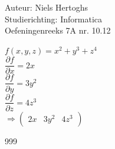 \documentclass[a4paper]{article}
\begin{document}
\noindent \large Auteur: Niels Hertoghs \\
\noindent \large Studierichting:  Informatica\\
\noindent \large Oefeningenreeks 7A nr. 10.12\\


\medskip

\normalsize

$f(x,y,z) = x^2 + y^3 + z^4$\\

$\dfrac{\partial f}{\partial x} = 2x$\\

$\dfrac{\partial f}{\partial y} = 3y^2$\\

$\dfrac{\partial f}{\partial z} = 4z^3$\\

$\Rightarrow 
\left(\begin{array}{ccc}
2x & 3y^2 & 4z^3
\end{array}\right)$

\begin{thebibliography}{999}
\end{thebibliography}
\end{document}

